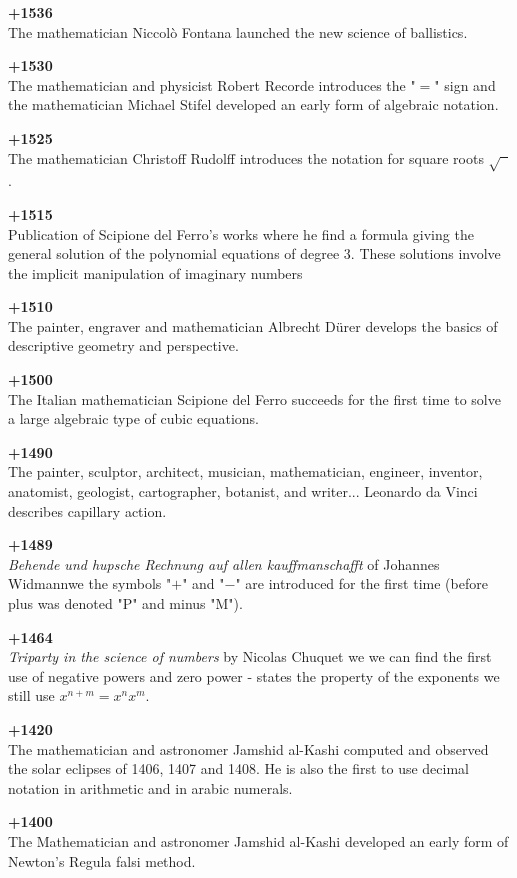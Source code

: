 \textbf{+1536}\\
The mathematician Niccolò Fontana launched the new science of ballistics.

\textbf{+1530}\\
The mathematician and physicist Robert Recorde introduces the "$=$" sign and the mathematician Michael Stifel developed an early form of algebraic notation.

\textbf{+1525}\\
The mathematician Christoff Rudolff introduces the notation for square roots $\sqrt{\phantom{a}}$.

\textbf{+1515}\\
Publication of Scipione del Ferro's works where he find a formula giving the general solution of the polynomial equations of degree $3$. These solutions involve the implicit manipulation of imaginary numbers

\textbf{+1510}\\
The painter, engraver and mathematician Albrecht Dürer develops the basics of descriptive geometry and perspective.

\textbf{+1500}\\
The Italian mathematician Scipione del Ferro succeeds for the first time to solve a large algebraic type of cubic equations.

\textbf{+1490}\\
The painter, sculptor, architect, musician, mathematician, engineer, inventor, anatomist, geologist, cartographer, botanist, and writer... Leonardo da Vinci describes capillary action.

\textbf{+1489}\\
\textit{Behende und hupsche Rechnung auf allen kauffmanschafft} of Johannes Widmannwe the symbols "$+$" and "$-$" are introduced for the first time (before plus was denoted "P" and minus "M").

\textbf{+1464}\\
\textit{Triparty in the science of numbers} by  Nicolas Chuquet we we can find the first use of negative powers and zero power - states the property of the exponents we still use $x^{n+m}=x^nx^m$.

\textbf{+1420}\\
The mathematician and astronomer Jamshid al-Kashi computed and observed the solar eclipses of 1406, 1407 and 1408. He is also the first to use decimal notation in arithmetic and in arabic numerals.

\textbf{+1400}\\
The Mathematician and astronomer Jamshid al-Kashi developed an early form of Newton's Regula falsi method.


